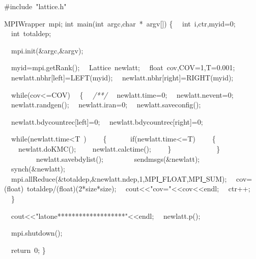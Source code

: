 {\ttfamily \raggedright \footnotesize
\#include\ "{}lattice.h"{}

MPIWrapper\ mpi;
int\ main(int\ argc,char\ *\ argv[])
\{
\ \ int\ i,ctr,myid=0;
\ \ int\ totaldep;

\ \ mpi.init(\&argc,\&argv);

\ \ myid=mpi.getRank();
\ \ Lattice\ newlatt;
\ \ float\ cov,COV=1,T=0.001;
\ \ newlatt.nbhr[left]=LEFT(myid);
\ \ newlatt.nbhr[right]=RIGHT(myid);

\ \ while(cov<{}=COV)
\ \ \{
\ \ \textsl{/**/}
\ \ newlatt.time=0;
\ \ newlatt.nevent=0;
\ \ newlatt.randgen();
\ \ newlatt.iran=0;
\ \ newlatt.saveconfig();

\ \ newlatt.bdycountrec[left]=0;
\ \ newlatt.bdycountrec[right]=0;


\ \ while(newlatt.time<{}T\ )
\ \ \ \ \{
\ \ \ \ \ \ if(newlatt.time<{}=T)
\ \ \ \ \{
\ \ \ \ newlatt.doKMC();
\ \ \ \ newlatt.calctime();
\ \ \ \ \}
\ \ \ \ \ \ \ \
\ \ \ \ \}
\ \ \ \ \ \ \
\ \ newlatt.savebdylist();
\ \ \ \ \ \
\ \ sendmsgs(\&newlatt);
\ \ synch(\&newlatt);
\ \ mpi.allReduce(\&totaldep,\&newlatt.ndep,1,MPI\underline\ FLOAT,MPI\underline\ SUM);
\ \ cov=(float)\ totaldep/(float)(2*size*size);
\ \ cout<{}<{}"{}cov="{}<{}<{}cov<{}<{}endl;
\ \ ctr++;
\ \ \}

\ \ cout<{}<{}"{}latone*******************"{}<{}<{}endl;
\ \ newlatt.p();

\ \ mpi.shutdown();

\ \ return\ 0;
\}


 }
\normalfont\normalsize

